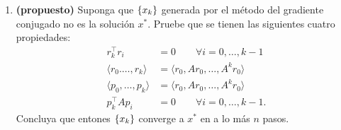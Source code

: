 \documentclass{article}
\begin{document}
\begin{enumerate}
\begin{enumerate}
		\item \textbf{(propuesto)} Suponga que \(\qty{x_k}\) generada por el método del gradiente conjugado no es la solución \(x^*\). Pruebe que se tienen las siguientes cuatro propiedades:
		\begin{align*}
			r_k^\top r_i &= 0 \qquad \forall i=0, \dots, k-1 \\
			\langle r_0. \dots, r_k \rangle &= \langle r_0, Ar_0, \dots, A^k r_0 \rangle \\
			\langle p_0, \dots, p_k \rangle &= \langle r_0, Ar_0, \dots, A^k r_0 \rangle \\
			p_k^\top A p_i &= 0 \qquad \forall i = 0, \dots, k - 1.
		\end{align*}
		Concluya que entones \(\qty{x_k}\) converge a \(x^*\) en a lo más \(n\) pasos.
	\end{enumerate}
\end{enumerate}
\end{document}
